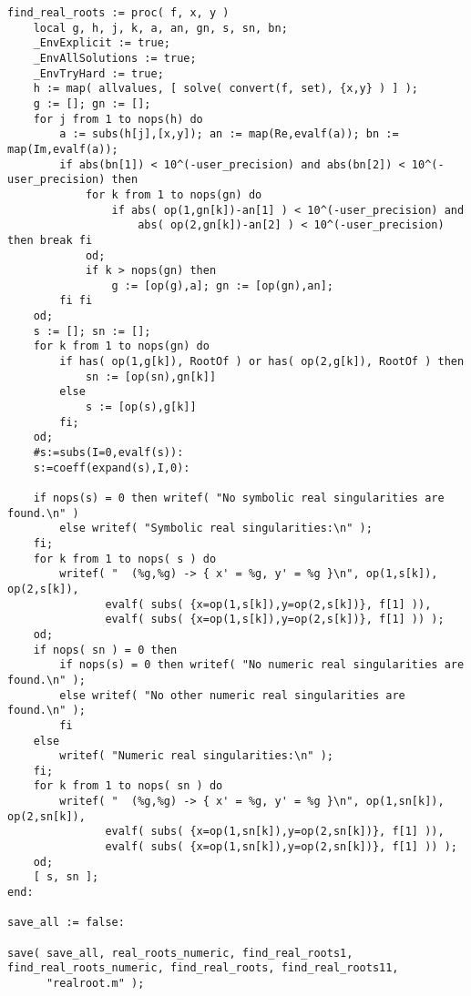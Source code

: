 \documentclass[a4paper,10pt]{article}
\begin{document}
\begin{lstlisting}[name=realroot]
find_real_roots := proc( f, x, y )
    local g, h, j, k, a, an, gn, s, sn, bn;
    _EnvExplicit := true;
    _EnvAllSolutions := true;
    _EnvTryHard := true;
    h := map( allvalues, [ solve( convert(f, set), {x,y} ) ] );
    g := []; gn := [];
    for j from 1 to nops(h) do
        a := subs(h[j],[x,y]); an := map(Re,evalf(a)); bn := map(Im,evalf(a));
        if abs(bn[1]) < 10^(-user_precision) and abs(bn[2]) < 10^(-user_precision) then
            for k from 1 to nops(gn) do
                if abs( op(1,gn[k])-an[1] ) < 10^(-user_precision) and
                    abs( op(2,gn[k])-an[2] ) < 10^(-user_precision) then break fi
            od;
            if k > nops(gn) then
                g := [op(g),a]; gn := [op(gn),an];
        fi fi
    od;
    s := []; sn := [];
    for k from 1 to nops(gn) do
        if has( op(1,g[k]), RootOf ) or has( op(2,g[k]), RootOf ) then
            sn := [op(sn),gn[k]]
        else
            s := [op(s),g[k]]
        fi;
    od;
    #s:=subs(I=0,evalf(s)):
    s:=coeff(expand(s),I,0):

    if nops(s) = 0 then writef( "No symbolic real singularities are found.\n" )
        else writef( "Symbolic real singularities:\n" );
    fi;
    for k from 1 to nops( s ) do
        writef( "  (%g,%g) -> { x' = %g, y' = %g }\n", op(1,s[k]), op(2,s[k]),
               evalf( subs( {x=op(1,s[k]),y=op(2,s[k])}, f[1] )),
               evalf( subs( {x=op(1,s[k]),y=op(2,s[k])}, f[1] )) );
    od;
    if nops( sn ) = 0 then
        if nops(s) = 0 then writef( "No numeric real singularities are found.\n" );
        else writef( "No other numeric real singularities are found.\n" );
        fi
    else
        writef( "Numeric real singularities:\n" );
    fi;
    for k from 1 to nops( sn ) do
        writef( "  (%g,%g) -> { x' = %g, y' = %g }\n", op(1,sn[k]), op(2,sn[k]),
               evalf( subs( {x=op(1,sn[k]),y=op(2,sn[k])}, f[1] )),
               evalf( subs( {x=op(1,sn[k]),y=op(2,sn[k])}, f[1] )) );
    od;
    [ s, sn ];
end:

save_all := false:

save( save_all, real_roots_numeric, find_real_roots1, find_real_roots_numeric, find_real_roots, find_real_roots11,
      "realroot.m" );
\end{lstlisting}
\end{document}
